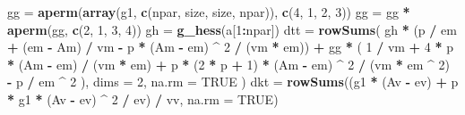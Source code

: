 \documentclass[]{article}
\newenvironment{Shaded}{\begin{snugshade}}{\end{snugshade}}
\newcommand{\DataTypeTok}[1]{\textcolor[rgb]{0.13,0.29,0.53}{#1}}
\newcommand{\DecValTok}[1]{\textcolor[rgb]{0.00,0.00,0.81}{#1}}
\newcommand{\KeywordTok}[1]{\textcolor[rgb]{0.13,0.29,0.53}{\textbf{#1}}}
\newcommand{\NormalTok}[1]{#1}
\newcommand{\OperatorTok}[1]{\textcolor[rgb]{0.81,0.36,0.00}{\textbf{#1}}}
\newcommand{\OtherTok}[1]{\textcolor[rgb]{0.56,0.35,0.01}{#1}}
\newcommand{\StringTok}[1]{\textcolor[rgb]{0.31,0.60,0.02}{#1}}
\begin{document}
\begin{Shaded}
\begin{Highlighting}[]
\NormalTok{  gg =}\StringTok{ }\KeywordTok{aperm}\NormalTok{(}\KeywordTok{array}\NormalTok{(g1, }\KeywordTok{c}\NormalTok{(npar, size, size, npar)), }\KeywordTok{c}\NormalTok{(}\DecValTok{4}\NormalTok{, }\DecValTok{1}\NormalTok{, }\DecValTok{2}\NormalTok{, }\DecValTok{3}\NormalTok{))}
\NormalTok{  gg =}\StringTok{ }\NormalTok{gg }\OperatorTok{*}\StringTok{ }\KeywordTok{aperm}\NormalTok{(gg, }\KeywordTok{c}\NormalTok{(}\DecValTok{2}\NormalTok{, }\DecValTok{1}\NormalTok{, }\DecValTok{3}\NormalTok{, }\DecValTok{4}\NormalTok{))}
\NormalTok{  gh =}\StringTok{ }\KeywordTok{g_hess}\NormalTok{(a[}\DecValTok{1}\OperatorTok{:}\NormalTok{npar])}
\NormalTok{  dtt =}\StringTok{ }\KeywordTok{rowSums}\NormalTok{(}
\NormalTok{    gh }\OperatorTok{*}\StringTok{ }\NormalTok{(p }\OperatorTok{/}\StringTok{ }\NormalTok{em }\OperatorTok{+}\StringTok{ }\NormalTok{(em }\OperatorTok{-}\StringTok{ }\NormalTok{Am) }\OperatorTok{/}\StringTok{ }\NormalTok{vm }\OperatorTok{-}\StringTok{ }\NormalTok{p }\OperatorTok{*}\StringTok{ }\NormalTok{(Am }\OperatorTok{-}\StringTok{ }\NormalTok{em) }\OperatorTok{^}\StringTok{ }\DecValTok{2} \OperatorTok{/}\StringTok{ }\NormalTok{(vm }\OperatorTok{*}\StringTok{ }\NormalTok{em)) }\OperatorTok{+}
\StringTok{      }\NormalTok{gg }\OperatorTok{*}\StringTok{ }\NormalTok{(}
        \DecValTok{1} \OperatorTok{/}\StringTok{ }\NormalTok{vm }\OperatorTok{+}\StringTok{ }\DecValTok{4} \OperatorTok{*}\StringTok{ }\NormalTok{p }\OperatorTok{*}\StringTok{ }\NormalTok{(Am }\OperatorTok{-}\StringTok{ }\NormalTok{em) }\OperatorTok{/}\StringTok{ }\NormalTok{(vm }\OperatorTok{*}\StringTok{ }\NormalTok{em) }\OperatorTok{+}\StringTok{ }\NormalTok{p }\OperatorTok{*}\StringTok{ }\NormalTok{(}\DecValTok{2} \OperatorTok{*}\StringTok{ }\NormalTok{p }\OperatorTok{+}\StringTok{ }\DecValTok{1}\NormalTok{) }\OperatorTok{*}\StringTok{ }\NormalTok{(Am }\OperatorTok{-}\StringTok{ }\NormalTok{em) }\OperatorTok{^}\StringTok{ }\DecValTok{2} \OperatorTok{/}
\StringTok{          }\NormalTok{(vm }\OperatorTok{*}\StringTok{ }\NormalTok{em }\OperatorTok{^}\StringTok{ }\DecValTok{2}\NormalTok{) }\OperatorTok{-}\StringTok{ }\NormalTok{p }\OperatorTok{/}\StringTok{ }\NormalTok{em }\OperatorTok{^}\StringTok{ }\DecValTok{2}
\NormalTok{      ),}
    \DataTypeTok{dims =} \DecValTok{2}\NormalTok{,}
    \DataTypeTok{na.rm =} \OtherTok{TRUE}
\NormalTok{  )}
\NormalTok{  dkt =}\StringTok{ }\KeywordTok{rowSums}\NormalTok{((g1 }\OperatorTok{*}\StringTok{ }\NormalTok{(Av }\OperatorTok{-}\StringTok{ }\NormalTok{ev) }\OperatorTok{+}\StringTok{ }\NormalTok{p }\OperatorTok{*}\StringTok{ }\NormalTok{g1 }\OperatorTok{*}\StringTok{ }\NormalTok{(Av }\OperatorTok{-}\StringTok{ }\NormalTok{ev) }\OperatorTok{^}\StringTok{ }\DecValTok{2} \OperatorTok{/}\StringTok{ }\NormalTok{ev) }\OperatorTok{/}\StringTok{ }\NormalTok{vv, }\DataTypeTok{na.rm =} \OtherTok{TRUE}\NormalTok{)}

\end{Highlighting}
\end{Shaded}
\end{document}

